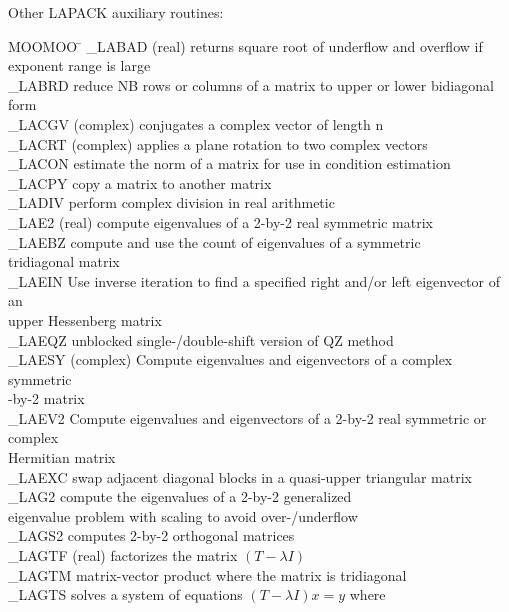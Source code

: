 \noindent
Other LAPACK auxiliary routines:
\begin{tabbing}
MOOMOO \= \kill
\_LABAD \> (real) returns square root of underflow and overflow if exponent range is large \\
\_LABRD \> reduce NB rows or columns of a matrix to upper or lower bidiagonal form \\
\_LACGV  \> (complex) conjugates a complex vector of length n \\
\_LACRT  \> (complex) applies a plane rotation to two complex vectors \\
\_LACON  \>estimate the norm of a matrix for use in condition estimation\\
\_LACPY \> copy a matrix to another matrix\\
\_LADIV \> perform complex division in real arithmetic \\
\_LAE2  \> (real) compute eigenvalues of a 2-by-2 real symmetric matrix\\
\_LAEBZ \> compute and use the count of eigenvalues of a symmetric \\
        \> tridiagonal matrix \\
\_LAEIN \> Use inverse iteration to find a specified right and/or left eigenvector of an \\
        \> upper Hessenberg matrix\\
\_LAEQZ \> unblocked single-/double-shift version of QZ method \\
\_LAESY \> (complex) Compute eigenvalues and eigenvectors of a complex symmetric \\
        -by-2 matrix\\
\_LAEV2 \> Compute eigenvalues and eigenvectors of a 2-by-2 real symmetric or complex \\
        \> Hermitian matrix\\
\_LAEXC \> swap adjacent diagonal blocks in a quasi-upper triangular matrix\\
\_LAG2  \> compute the eigenvalues of a 2-by-2 generalized \\
        \> eigenvalue problem with scaling to avoid over-/underflow \\
\_LAGS2 \> computes 2-by-2 orthogonal matrices \\
\_LAGTF \> (real) factorizes the matrix $(T - \lambda I)$ \\
\_LAGTM \> matrix-vector product where the matrix is tridiagonal \\
\_LAGTS \> solves a system of equations $(T - \lambda I)x = y$ where \\

\end{tabbing}
